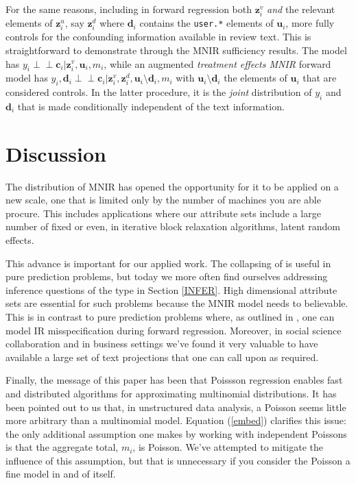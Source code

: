 \documentclass[12pt]{article}
\newcommand{\bm}[1]{\mathbf{#1}}
\newcommand{\indep}{\perp\!\!\!\perp}
\newcommand{\cd}[1]{{\tt#1}}
\begin{document}
For the same reasons, including in forward regression both $\bm{z}_i^v$ {\it
and} the relevant elements of $\bm{z}_i^u$, say $\bm{z}_i^d$ where $\bm{d}_i$
contains the \cd{user.*} elements of $\bm{u}_i$, more fully controls for the
confounding information available in review text. This is straightforward to
demonstrate through the MNIR sufficiency results.  The model  has $y_i \indep
\bm{c}_i | \bm{z}^v_i, \bm{u}_i, m_i$, while an augmented {\it treatment
effects MNIR} forward model has $y_i, \bm{d}_i \indep
\bm{c}_i | \bm{z}^v_i,\bm{z}^d_i, \bm{u}_i\!\setminus\!\bm{d}_i, m_i$ with
$\bm{u}_i\!\setminus\!\bm{d}_i$ the  elements of $\bm{u}_i$ that are
considered controls. In the latter procedure, it is  the {\it joint}
distribution of $y_i$ and $\bm{d}_i$ that is made conditionally independent of
the text information.

\section{Discussion}
\label{END}

The distribution of MNIR has opened the opportunity for it to be applied on a new  scale, one that is limited only by the number of machines you are able procure.  This includes applications where our attribute sets include a large number of fixed or even, in iterative block relaxation algorithms, latent random effects.  

This advance is important for our applied work.  The collapsing of \cite{taddy_multinomial_2013} is useful in pure prediction problems, but today we more often find ourselves addressing inference questions  of the type in Section \ref{INFER}.  High dimensional attribute sets are essential for such problems because the MNIR model needs to believable. This is in contrast to pure prediction problems where, as outlined in \cite{taddy_rejoinder:_2013}, one can model IR misspecification during forward regression.  Moreover, in social science collaboration and in business settings we've found it very valuable to have available a large set of text projections that one can call upon as required.  

Finally, the message of this paper has been that Poissson regression  enables fast and distributed
algorithms for approximating multinomial distributions.  It has been pointed
out to us that, in unstructured data analysis, a Poisson seems little more
arbitrary than a multinomial model.  Equation (\ref{embed}) clarifies
this issue:  the only additional assumption one makes by working with
independent Poissons is that the aggregate total, $m_i$, is Poisson.  We've
attempted to mitigate the influence of this assumption, but that is
unnecessary if you consider the Poisson a fine model in and of itself.
\end{document}
